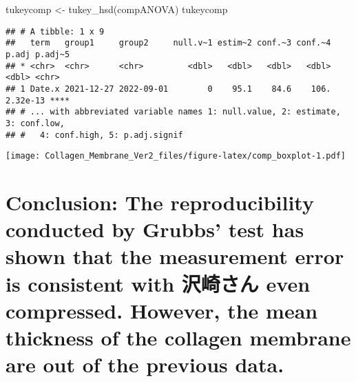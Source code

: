 \documentclass[
]{article}
\newenvironment{Shaded}{\begin{snugshade}}{\end{snugshade}}
\newcommand{\FunctionTok}[1]{\textcolor[rgb]{0.00,0.00,0.00}{#1}}
\newcommand{\NormalTok}[1]{#1}
\newcommand{\OtherTok}[1]{\textcolor[rgb]{0.56,0.35,0.01}{#1}}
\begin{document}
\begin{Shaded}
\begin{Highlighting}[]
\NormalTok{tukeycomp }\OtherTok{\textless{}{-}} \FunctionTok{tukey\_hsd}\NormalTok{(compANOVA)}
\NormalTok{tukeycomp}
\end{Highlighting}
\end{Shaded}

\begin{verbatim}
## # A tibble: 1 x 9
##   term   group1     group2     null.v~1 estim~2 conf.~3 conf.~4    p.adj p.adj~5
## * <chr>  <chr>      <chr>         <dbl>   <dbl>   <dbl>   <dbl>    <dbl> <chr>  
## 1 Date.x 2021-12-27 2022-09-01        0    95.1    84.6    106. 2.32e-13 ****   
## # ... with abbreviated variable names 1: null.value, 2: estimate, 3: conf.low,
## #   4: conf.high, 5: p.adj.signif
\end{verbatim}

\texttt{[image: Collagen\_Membrane\_Ver2\_files/figure-latex/comp\_boxplot-1.pdf]}

\hypertarget{conclusion-the-reproducibility-conducted-by-grubbs-test-has-shown-that-the-measurement-error-is-consistent-with-ux6ca2ux5d0eux3055ux3093-even-compressed.-however-the-mean-thickness-of-the-collagen-membrane-are-out-of-the-previous-data.}{%
\section{Conclusion: The reproducibility conducted by Grubbs' test has
shown that the measurement error is consistent with 沢崎さん even
compressed. However, the mean thickness of the collagen membrane are out
of the previous
data.}\label{conclusion-the-reproducibility-conducted-by-grubbs-test-has-shown-that-the-measurement-error-is-consistent-with-ux6ca2ux5d0eux3055ux3093-even-compressed.-however-the-mean-thickness-of-the-collagen-membrane-are-out-of-the-previous-data.}}
\end{document}
